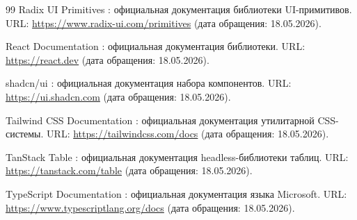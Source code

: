 \begin{thebibliography}{99}
   Radix UI Primitives : официальная документация библиотеки UI-примитивов. URL: \url{https://www.radix-ui.com/primitives} (дата обращения: 18.05.2026).

   React Documentation : официальная документация библиотеки. URL: \url{https://react.dev} (дата обращения: 18.05.2026).

   shadcn/ui : официальная документация набора компонентов. URL: \url{https://ui.shadcn.com} (дата обращения: 18.05.2026).

   Tailwind CSS Documentation : официальная документация утилитарной CSS-системы. URL: \url{https://tailwindcss.com/docs} (дата обращения: 18.05.2026).

   TanStack Table : официальная документация headless-библиотеки таблиц. URL: \url{https://tanstack.com/table} (дата обращения: 18.05.2026).

   TypeScript Documentation : официальная документация языка Microsoft. URL: \url{https://www.typescriptlang.org/docs} (дата обращения: 18.05.2026).
\end{thebibliography}
